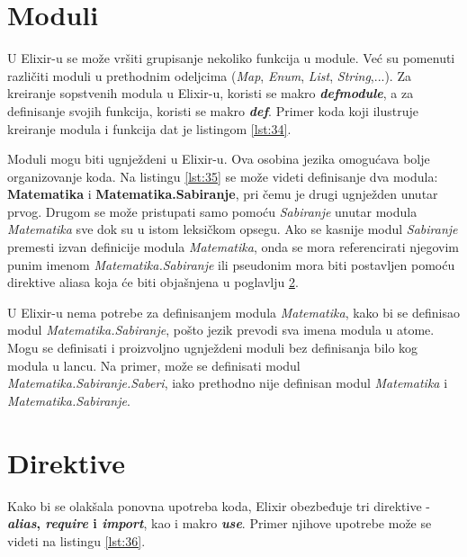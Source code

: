 \documentclass[12pt,oneside]{memoir}
\begin{document}
\section{Moduli}

U Elixir-u se može vršiti grupisanje nekoliko funkcija u module. Već su pomenuti različiti moduli u prethodnim odeljcima (\textit{Map}, \textit{Enum}, \textit{List}, \textit{String},...). Za kreiranje sopstvenih modula u Elixir-u, koristi se makro \textbf{\textit{defmodule}}, a za definisanje svojih funkcija, koristi se makro \textbf{\textit{def}}. Primer koda koji ilustruje kreiranje modula i funkcija dat je listingom \ref{lst:34}.



Moduli mogu biti ugnježdeni u Elixir-u. Ova osobina jezika omogućava bolje organizovanje koda. Na listingu \ref{lst:35} se može videti definisanje dva modula: \textbf{Matematika} i \textbf{Matematika.Sabiranje}, pri čemu je drugi ugnježden unutar prvog. Drugom se može pristupati samo pomoću \textit{Sabiranje} unutar modula \textit{Matematika} sve dok su u istom leksičkom opsegu. Ako se kasnije modul \textit{Sabiranje} premesti izvan definicije modula \textit{Matematika}, onda se mora referencirati njegovim punim imenom \textit{Matematika.Sabiranje} ili pseudonim mora biti postavljen pomoću direktive aliasa koja će biti objašnjena u poglavlju \ref{poglavlje:Direktive}.

\newpage



\noindent U Elixir-u nema potrebe za definisanjem modula \textit{Matematika}, kako bi se definisao modul \textit{Matematika.Sabiranje}, pošto jezik prevodi sva imena modula u atome. Mogu se  definisati i proizvoljno ugnježdeni moduli bez definisanja bilo kog modula u lancu. Na primer, može se definisati modul \textit{Matematika.Sabiranje.Saberi}, iako  prethodno nije definisan modul \textit{Matematika} i \textit{Matematika.Sabiranje}.

\section{Direktive}
\label{poglavlje:Direktive}

Kako bi se olakšala ponovna upotreba koda, Elixir obezbeđuje tri direktive - \textbf{\textit{alias}, \textit{require} i \textit{import}}, kao i makro \textbf{\textit{use}}. Primer njihove upotrebe može se videti na listingu \ref{lst:36}.
\end{document}
